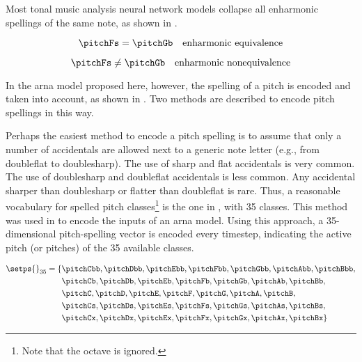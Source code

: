 
Most tonal music analysis neural network models collapse all
enharmonic spellings of the same note, as shown in
.

\begin{equation}
    \label{eq:enharmonic_equivalence}
    \pitchFs = \pitchGb \quad \text{enharmonic equivalence}
\end{equation}

\begin{equation}
    \label{eq:enharmonic_nonequivalence}
    \pitchFs \neq \pitchGb \quad \text{enharmonic nonequivalence}
\end{equation}

In the \gls{arna} model proposed here, however, the spelling
of a pitch is encoded and taken into account, as shown in
. Two methods are described
to encode pitch spellings in this way.



Perhaps the easiest method to encode a pitch spelling is to
assume that only a number of accidentals are allowed next to
a generic note letter (e.g., from \gls{doubleflat} to
\gls{doublesharp}). The use of \gls{sharp} and \gls{flat}
accidentals is very common. The use of \gls{doublesharp} and
\gls{doubleflat} accidentals is less common. Any accidental
sharper than \gls{doublesharp} or flatter than
\gls{doubleflat} is rare. Thus, a reasonable vocabulary for
spelled pitch classes\footnote{Note that the octave is
ignored.} is the one in , with 35
classes. This method was used in \textcite{micchi2020not,
micchi2021deep} to encode the inputs of an \gls{arna} model.
Using this approach, a 35-dimensional pitch-spelling vector
is encoded every timestep, indicating the active pitch (or
pitches) of the 35 available classes.

\begin{equation}
    \label{eq:pitch_spelling_35}
    \begin{split}
    \setps{}_{35} = \{ & \pitchCbb, \pitchDbb, \pitchEbb, \pitchFbb, \pitchGbb, \pitchAbb, \pitchBbb, \\
    & \pitchCb, \pitchDb, \pitchEb, \pitchFb, \pitchGb, \pitchAb, \pitchBb, \\
    & \pitchC, \pitchD, \pitchE, \pitchF, \pitchG, \pitchA, \pitchB, \\
    & \pitchCs, \pitchDs, \pitchEs, \pitchFs, \pitchGs, \pitchAs, \pitchBs, \\
    & \pitchCx, \pitchDx, \pitchEx, \pitchFx, \pitchGx, \pitchAx, \pitchBx \}
    \end{split}
\end{equation}

